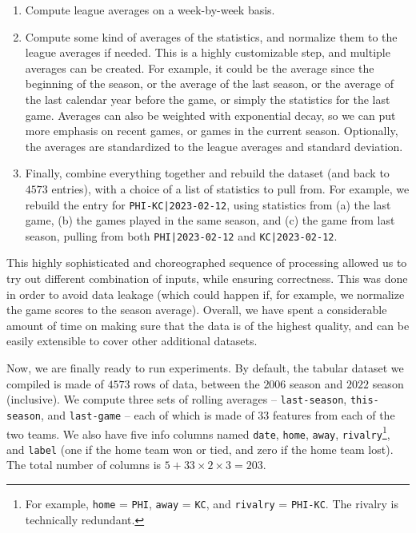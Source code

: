 \documentclass[10pt]{article}
\begin{document}
\begin{enumerate}
\item Compute league averages on a week-by-week basis.

\item Compute some kind of averages of the statistics, and normalize them to the league
  averages if needed. This is a highly customizable step, and multiple averages can be
created. For example, it could be the average since the beginning of the season, or the
average of the last season, or the average of the last calendar year before the game, or
simply the statistics for the last game. Averages can also be weighted with exponential
decay, so we can put more emphasis on recent games, or games in the current season.
Optionally, the averages are standardized to the
league averages and standard deviation.

\item Finally, combine everything together and rebuild the dataset (and back to $4573$
entries), with a choice of a list of statistics to pull from.
For example, we rebuild the entry for \texttt{PHI-KC|2023-02-12}, using
statistics from (a) the last game, (b) the games played in the same
season, and (c) the game from last season, pulling from both
\texttt{PHI|2023-02-12} and \texttt{KC|2023-02-12}.
\end{enumerate}

This highly sophisticated and choreographed sequence of processing allowed us to
try out different combination of inputs, while ensuring correctness. This was done in order
to avoid data leakage (which could happen if, for example, we normalize the game scores
to the season average). Overall, we have spent a considerable amount of time on making sure
that the data is of the highest quality, and can be easily extensible to cover other
additional datasets.

Now, we are finally ready to run experiments. By default, the tabular dataset we
compiled is made of $4573$ rows of data, between the $2006$ season and $2022$ season (inclusive).
We compute three sets of rolling averages -- \texttt{last-season}, \texttt{this-season}, and
\texttt{last-game} -- each of which is made of $33$ features from each of the two teams.
We also have five info columns named
\texttt{date}, \texttt{home}, \texttt{away}, \texttt{rivalry}\footnote{
For example, \texttt{home} = \texttt{PHI}, \texttt{away} = \texttt{KC}, and \texttt{rivalry} = \texttt{PHI-KC}. The rivalry is technically redundant.},
and \texttt{label} (one if the home team won or tied, and zero if the home team lost).
The total number of columns is $5+33\times 2 \times 3 = 203$.
\end{document}
